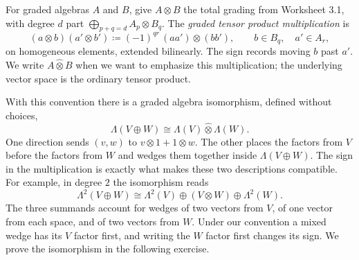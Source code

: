 \documentclass[12pt,reqno]{amsart}
\begin{document}
For graded algebras $A$ and $B$, give $A\otimes B$ the total grading from Worksheet 3.1, with degree $d$ part $\bigoplus_{p+q=d}A_p\otimes B_q$. The \emph{graded tensor product multiplication} is
\[
(a\otimes b)(a'\otimes b')\coloneqq(-1)^{qr}\,(aa')\otimes(bb'),\qquad b\in B_q,\quad a'\in A_r,
\]
on homogeneous elements, extended bilinearly. The sign records moving $b$ past $a'$. We write $A\mathbin{\widehat\otimes}B$ when we want to emphasize this multiplication; the underlying vector space is the ordinary tensor product.

With this convention there is a graded algebra isomorphism, defined without choices,
\[
\Lambda(V\oplus W)\cong\Lambda(V)\mathbin{\widehat\otimes}\Lambda(W).
\]
One direction sends $(v,w)$ to $v\otimes1+1\otimes w$. The other places the factors from $V$ before the factors from $W$ and wedges them together inside $\Lambda(V\oplus W)$. The sign in the multiplication is exactly what makes these two descriptions compatible. For example, in degree $2$ the isomorphism reads
\[
\Lambda^2(V\oplus W)\cong\Lambda^2(V)\oplus(V\otimes W)\oplus\Lambda^2(W).
\]
The three summands account for wedges of two vectors from $V$, of one vector from each space, and of two vectors from $W$. Under our convention a mixed wedge has its $V$ factor first, and writing the $W$ factor first changes its sign. We prove the isomorphism in the following exercise.

\hrulefill
\end{document}
